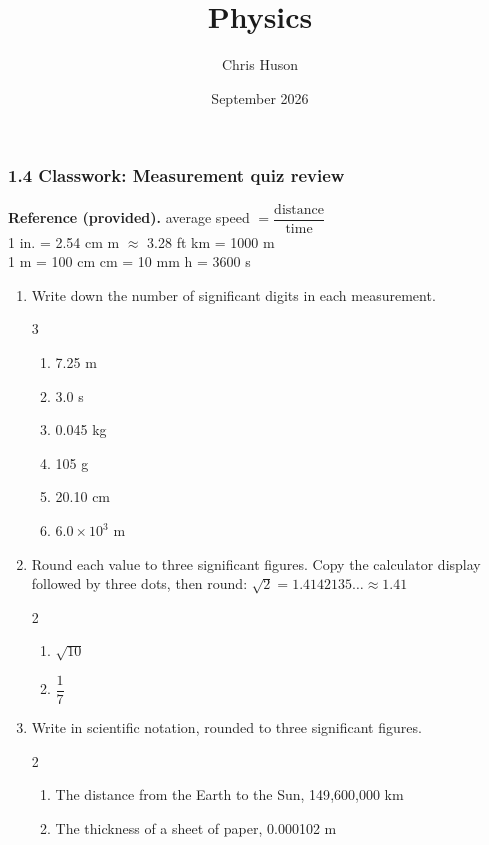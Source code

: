 \documentclass[12pt, twoside]{article}
\title{Physics}
\author{Chris Huson}
\date{September 2026}
\begin{document}
\subsubsection*{1.4 Classwork: Measurement quiz review}

\textbf{Reference (provided).} \quad
average speed $= \dfrac{\text{distance}}{\text{time}}$ \\[0.1cm]
1 in. = 2.54 cm  m $\approx$ 3.28 ft  km = 1000 m \\
1 m = 100 cm  cm = 10 mm  h = 3600 s

\vspace{0.3cm}

\begin{enumerate}[itemsep=0.6cm]

\item Write down the number of significant digits in each measurement.
  \begin{multicols}{3}
    \begin{enumerate}[itemsep=0.5cm]
      \item 7.25 m
      \item 3.0 s
      \item 0.045 kg
      \item 105 g
      \item 20.10 cm
      \item $6.0 \times 10^{3}$ m
    \end{enumerate}
  \end{multicols} \vspace{0.6cm}

\item Round each value to three significant figures. Copy the calculator display
  followed by three dots, then round: $\sqrt{2} = 1.4142135\ldots \approx 1.41$
  \begin{multicols}{2}
    \begin{enumerate}[itemsep=1.5cm]
      \item $\sqrt{10}$
      \item $\dfrac{1}{7}$
    \end{enumerate}
  \end{multicols} \vspace{1.3cm}

\item Write in scientific notation, rounded to three significant figures.
  \begin{multicols}{2}
    \raggedright
    \begin{enumerate}[itemsep=1.5cm]
      \item The distance from the Earth to the Sun, 149{,}600{,}000 km
      \item The thickness of a sheet of paper, 0.000102 m
    \end{enumerate}
  \end{multicols} \vspace{1.3cm}


\end{enumerate}
\end{document}
